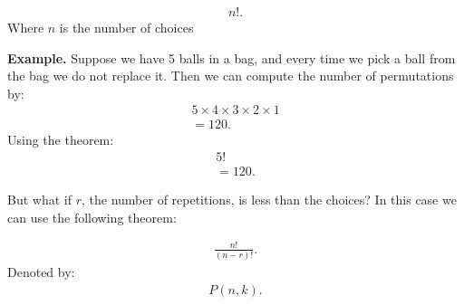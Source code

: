 \documentclass{report}
\begin{document}
    \bigbreak \noindent \bigbreak \noindent 
    \begin{thrm}
       \begin{align*}
           n!
       .\end{align*} 
       Where $n$ is the number of choices
    \end{thrm}
    \bigbreak \noindent 
    \textbf{Example.} Suppose we have 5 balls in a bag, and every time we pick a ball from the bag we do not replace it. Then we can compute the number of permutations by:
    \begin{align*}
        5 \times 4 \times 3 \times 2 \times 1 \\
        = 120
    .\end{align*}
    Using the theorem:
    \begin{align*}
        5! \\
        = 120
    .\end{align*}

    \bigbreak \noindent 
    But what if $r$, the number of repetitions, is less than the choices? In this case we can use the following theorem:
    \bigbreak \noindent 
    \begin{thrm}
       \begin{align*}
           \frac{n!}{(n-r)!}
       .\end{align*} 
        Denoted by:
         \begin{align*}
           P(n,k)
         .\end{align*}
    \end{thrm}

    \pagebreak \bigbreak \noindent 
\end{document}
